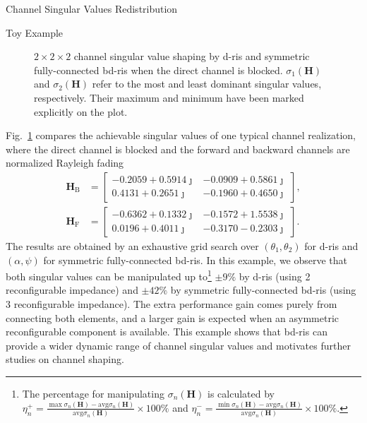 \documentclass[journal]{IEEEtran}
\begin{document}
\begin{section}{Channel Singular Values Redistribution}
\begin{subsection}{Toy Example}
\begin{figure}
			\caption{$2 \times 2 \times 2$ channel singular value shaping by \gls{d}-\gls{ris} and symmetric fully-connected \gls{bd}-\gls{ris} when the direct channel is blocked. $\sigma_1(\mathbf{H})$ and $\sigma_2(\mathbf{H})$ refer to the most and least dominant singular values, respectively.
			Their maximum and minimum have been marked explicitly on the plot.}
			\label{fg:singular_trend}
		\end{figure}
		Fig.~\ref{fg:singular_trend} compares the achievable singular values of one typical channel realization, where the direct channel is blocked and the forward and backward channels are normalized Rayleigh fading
		\begin{equation*}
			\begin{split}
				\mathbf{H}_\mathrm{B} & =
				\begin{bmatrix}
					-0.2059 + 0.5914 \jmath & -0.0909 + 0.5861 \jmath \\
					0.4131 + 0.2651 \jmath & -0.1960 + 0.4650 \jmath
				\end{bmatrix},
				\\
				\mathbf{H}_\mathrm{F} & =
				\begin{bmatrix}
					-0.6362 + 0.1332 \jmath & -0.1572 + 1.5538 \jmath \\
					0.0196 + 0.4011 \jmath & -0.3170 - 0.2303 \jmath
				\end{bmatrix}.
			\end{split}
		\end{equation*}
		The results are obtained by an exhaustive grid search over $(\theta_1, \theta_2)$ for \gls{d}-\gls{ris} and $(\alpha, \psi)$ for symmetric fully-connected \gls{bd}-\gls{ris}.
		In this example, we observe that both singular values can be manipulated up to\footnote{The percentage for manipulating $\sigma_n(\mathbf{H})$ is calculated by $\eta_n^+ = \frac{\max \sigma_n(\mathbf{H}) - \mathrm{avg} \sigma_n(\mathbf{H})}{\mathrm{avg} \sigma_n(\mathbf{H})} \times 100\%$ and  $\eta_n^- = \frac{\min \sigma_n(\mathbf{H}) - \mathrm{avg} \sigma_n(\mathbf{H})}{\mathrm{avg} \sigma_n(\mathbf{H})} \times 100\%$.} $\pm 9\%$ by \gls{d}-\gls{ris} (using 2 reconfigurable impedance) and $\pm 42\%$ by symmetric fully-connected \gls{bd}-\gls{ris} (using 3 reconfigurable impedance).
		The extra performance gain comes purely from connecting both elements, and a larger gain is expected when an asymmetric reconfigurable component is available.
		This example shows that \gls{bd}-\gls{ris} can provide a wider dynamic range of channel singular values and motivates further studies on channel shaping.
	\end{subsection}


\end{section}
\end{document}
